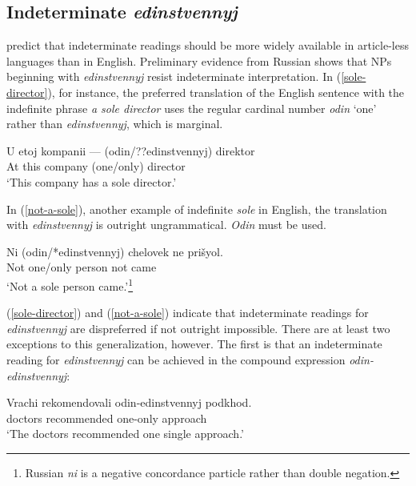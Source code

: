 \documentclass{article}
\begin{document}
\subsection{Indeterminate \textit{edinstvennyj}}
\citet{cb2015} predict that indeterminate readings should be more widely available in article-less languages than in English. Preliminary evidence from Russian shows that NPs beginning with \textit{edinstvennyj} resist indeterminate interpretation. In (\ref{sole-director}), for instance, the preferred translation of the English sentence with the indefinite phrase \textit{a sole director} uses the regular cardinal number \textit{odin} `one' rather than \textit{edinstvennyj}, which is marginal.

\begin{exe}
	\ex \label{sole-director} \gll U etoj kompanii --- (odin/??edinstvennyj) direktor\\
	At this company {} (one/only) director\\
	\glt `This company has a sole director.'
\end{exe}


In (\ref{not-a-sole}), another example of indefinite \textit{sole} in English, the translation with \textit{edinstvennyj} is outright ungrammatical. \textit{Odin} must be used.

\begin{exe}
	\ex \label{not-a-sole} \gll Ni (odin/*edinstvennyj) chelovek ne pri\v{s}yol.\\
	Not one/only person not came\\
	\glt `Not a sole person came.'\footnote{Russian \textit{ni} is a negative concordance particle rather than double negation.}
\end{exe}

(\ref{sole-director}) and (\ref{not-a-sole}) indicate that indeterminate readings for \textit{edinstvennyj} are dispreferred if not outright impossible. There are at least two exceptions to this generalization, however. The first is that an indeterminate reading for \textit{edinstvennyj} can be achieved in the compound expression \textit{odin-edinstvennyj}:

\begin{exe}
	\ex \label{odin-edinstvennyj} \gll Vrachi rekomendovali odin-edinstvennyj podkhod.\\
	doctors recommended one-only approach\\
	`The doctors recommended one single approach.'
\end{exe}
\end{document}
